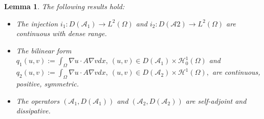 \documentclass[9pt,reqno]{amsart}
\theoremstyle{plain}
\newtheorem{lemma}[theorem]{Lemma}
\numberwithin{equation}{section}
\numberwithin{theorem}{section}
\def\Om{\Omega}
\def\Om{\Omega}
\def\mcH{\mathcal{H}}
\begin{document}
	\begin{lemma}\label{2.15}
		The following results hold:
		\begin{itemize}
			\item [(1)] The injection $i_1: D(\mathcal{A}_1)\to L^2(\Om)$ and $i_2: D(\mathcal{A}2)\to L^2(\Om)$ are continuous with dense range.
			\item [(2)] The bilinear form $q_1(u,v):= \int_\Om \nabla u \cdot A \nabla v dx, \ (u,v)\in D(\mathcal{A}_1)\times \mcH^1_0(\Omega)$ and $q_2(u,v):= \int_\Om \nabla u \cdot A \nabla v dx, \ (u,v)\in D(\mathcal{A}_2)\times \mcH^1(\Omega),$ are continuous, positive, symmetric.
			\item [(3)]  The operators $(\mathcal{A}_1,D(\mathcal{A}_1))$ and $(\mathcal{A}_2,D(\mathcal{A}_2))$ are self-adjoint and dissipative.
		\end{itemize}
	\end{lemma}
\end{document}
